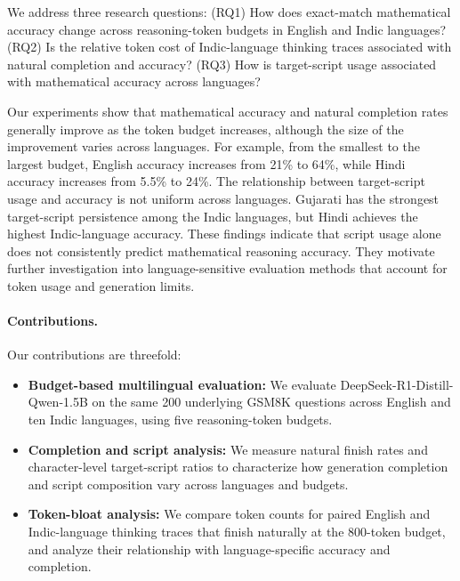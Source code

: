 \documentclass[11pt]{article}
\begin{document}
We address three research questions: (RQ1) How does exact-match mathematical accuracy change across reasoning-token budgets in English and Indic languages? (RQ2) Is the relative token cost of Indic-language thinking traces associated with natural completion and accuracy? (RQ3) How is target-script usage associated with mathematical accuracy across languages?

Our experiments show that mathematical accuracy and natural completion rates generally improve as the token budget increases, although the size of the improvement varies across languages. For example, from the smallest to the largest budget, English accuracy increases from 21\% to 64\%, while Hindi accuracy increases from 5.5\% to 24\%. The relationship between target-script usage and accuracy is not uniform across languages. Gujarati has the strongest target-script persistence among the Indic languages, but Hindi achieves the highest Indic-language accuracy. These findings indicate that script usage alone does not consistently predict mathematical reasoning accuracy. They motivate further investigation into language-sensitive evaluation methods that account for token usage and generation limits.

\paragraph{Contributions.}
Our contributions are threefold:
\begin{itemize}
    \item \textbf{Budget-based multilingual evaluation:} We evaluate DeepSeek-R1-Distill-Qwen-1.5B on the same 200 underlying GSM8K questions across English and ten Indic languages, using five reasoning-token budgets.
    \item \textbf{Completion and script analysis:} We measure natural finish rates and character-level target-script ratios to characterize how generation completion and script composition vary across languages and budgets.
    \item \textbf{Token-bloat analysis:} We compare token counts for paired English and Indic-language thinking traces that finish naturally at the 800-token budget, and analyze their relationship with language-specific accuracy and completion.
\end{itemize}
\end{document}
